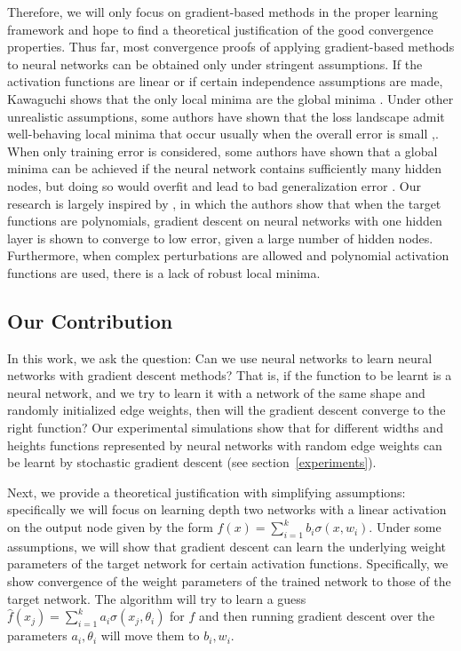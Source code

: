 \documentclass[11pt]{article}
\begin{document}
Therefore, we will only focus on gradient-based methods in the proper learning framework and hope to find a theoretical justification of the good convergence properties. Thus far, most convergence proofs of applying gradient-based methods to neural networks can be obtained only under stringent assumptions. If the activation functions are linear or if certain independence assumptions are made, Kawaguchi shows that the only local minima are the global minima \cite{Kawaguchi16a}. Under other unrealistic assumptions, some authors have shown that the loss landscape admit well-behaving local minima that occur usually when the overall error is small \cite{ChoromanskaHMAL14},\cite{DauphinPGCGB14}. When only training error is considered, some authors have shown that a global minima can be achieved if the neural network contains sufficiently many hidden nodes, but doing so would overfit and lead to bad generalization error \cite{SoudryC16}. Our research is largely inspired by \cite{valiant2014learning}, in which the authors show that when the target functions are polynomials, gradient descent on neural networks with one hidden layer is shown to converge to low error, given a large number of hidden nodes. Furthermore, when complex perturbations are allowed and polynomial activation functions are used, there is a lack of robust local minima. 

\subsection{Our Contribution}

In this work, we ask the question: Can we use neural networks to learn neural networks with gradient descent methods? That is, if the function to be learnt is a neural network, and we try to learn it with a network of the same shape and randomly initialized edge weights, then will the gradient descent converge to the right function? Our experimental simulations show that for different widths and heights functions represented by neural networks with random edge weights can be learnt by stochastic gradient descent (see section~\ref{experiments}).

Next, we provide a theoretical justification with simplifying assumptions: specifically we will focus on learning depth two networks with a linear activation on the output node given by the form $f(x) = \sum_{i=1}^k b_i\sigma(x,w_i)$. Under some assumptions, we will show that gradient descent can learn the underlying weight parameters of the target network for certain activation functions. Specifically, we show convergence of the weight parameters of the trained network to those of the target network. The algorithm will try to learn a guess $\widehat{f}(x_j) = \sum_{i=1}^k a_i \sigma(x_j,\theta_i)$ for $f$ and then running gradient descent over the parameters $a_i, \theta_i$ will move them to $b_i, w_i$. 
\end{document}
